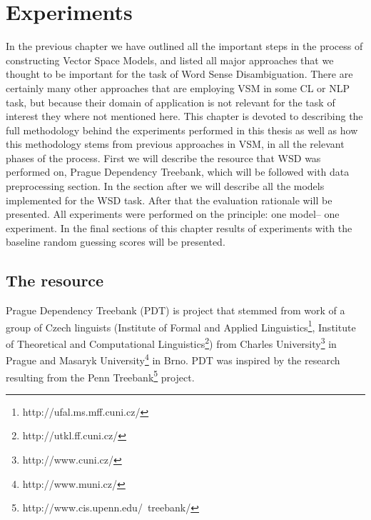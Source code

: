 \chapter{Experiments}
In the previous chapter we have outlined all the important steps in the process of constructing Vector 
Space Models, and listed all major approaches that we thought to be important for the task of Word 
Sense Disambiguation. There are certainly many other approaches that are employing VSM in some CL 
or NLP task, but because their domain of application is not relevant for the task of interest they where not 
mentioned here. This chapter is devoted to describing the full methodology behind the experiments 
performed in this thesis as well as how this methodology stems from previous approaches in VSM, 
in all the relevant phases of the process. First we will describe the resource that WSD was performed on, 
Prague Dependency Treebank, which will be followed with data preprocessing section. In the section 
after we will describe all the models implemented for the WSD task. After that the evaluation rationale 
will be presented. All experiments were performed on the principle: one model-- one experiment. In the 
final sections of this chapter results of experiments with the baseline random guessing scores will be 
 presented.


\section{The resource}
Prague Dependency Treebank (PDT) is  project that stemmed from work of a group of Czech linguists 
(Institute of Formal and Applied Linguistics\footnote{http://ufal.ms.mff.cuni.cz/}, Institute of Theoretical 
and Computational  Linguistics\footnote{http://utkl.ff.cuni.cz/}) from Charles 
University\footnote{http://www.cuni.cz/} in Prague and Masaryk 
University\footnote{http://www.muni.cz/}  in Brno. PDT was  inspired by the research resulting from the 
Penn Treebank\footnote{http://www.cis.upenn.edu/~treebank/} project. 

